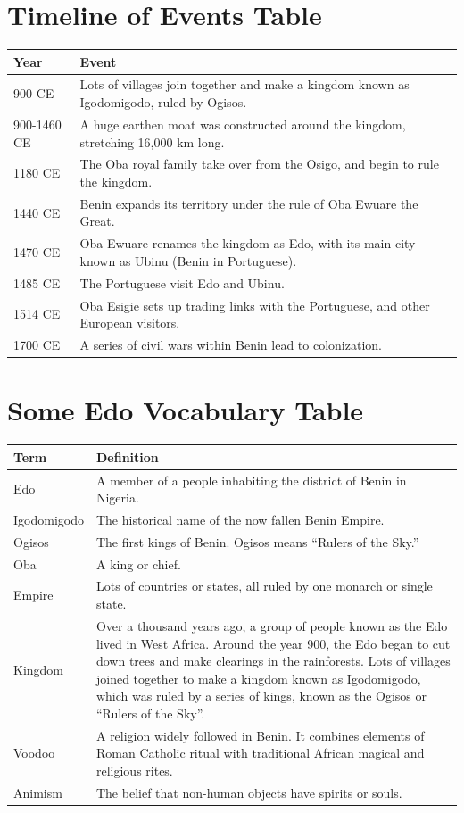 \section*{Timeline of Events Table}
\begin{tabular}{|l|p{10cm}|}
\hline
\textbf{Year} & \textbf{Event} \\
\hline
900 CE & Lots of villages join together and make a kingdom known as Igodomigodo, ruled by Ogisos. \\
\hline
900-1460 CE & A huge earthen moat was constructed around the kingdom, stretching 16,000 km long. \\
\hline
1180 CE & The Oba royal family take over from the Osigo, and begin to rule the kingdom. \\
\hline
1440 CE & Benin expands its territory under the rule of Oba Ewuare the Great. \\
\hline
1470 CE & Oba Ewuare renames the kingdom as Edo, with its main city known as Ubinu (Benin in Portuguese). \\
\hline
1485 CE & The Portuguese visit Edo and Ubinu. \\
\hline
1514 CE & Oba Esigie sets up trading links with the Portuguese, and other European visitors. \\
\hline
1700 CE & A series of civil wars within Benin lead to colonization. \\
\hline
\end{tabular}
\label{tab:timeline}

\vspace{1cm} 

\section*{Some Edo Vocabulary Table}
\begin{tabular}{|l|p{10cm}|}
\hline
\textbf{Term} & \textbf{Definition} \\
\hline
Edo & A member of a people inhabiting the district of Benin in Nigeria. \\
\hline
Igodomigodo & The historical name of the now fallen Benin Empire. \\
\hline
Ogisos & The first kings of Benin. Ogisos means “Rulers of the Sky.” \\
\hline
Oba & A king or chief. \\
\hline
Empire & Lots of countries or states, all ruled by one monarch or single state. \\
\hline
Kingdom & Over a thousand years ago, a group of people known as the Edo lived in West Africa. Around the year 900, the Edo began to cut down trees and make clearings in the rainforests. Lots of villages joined together to make a kingdom known as Igodomigodo, which was ruled by a series of kings, known as the Ogisos or “Rulers of the Sky”. \\
\hline
Voodoo & A religion widely followed in Benin. It combines elements of Roman Catholic ritual with traditional African magical and religious rites. \\
\hline
Animism & The belief that non-human objects have spirits or souls. \\
\hline
\end{tabular}
\label{tab:edo_vocab}



